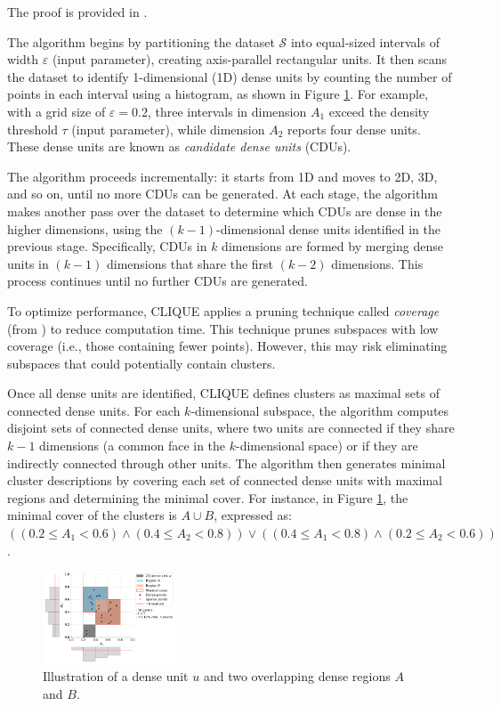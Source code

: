 The proof is provided in \cite{clique}.

The algorithm begins by partitioning the dataset $\mathcal{S}$ into equal-sized intervals of width $\varepsilon$ (input parameter), creating axis-parallel rectangular units. It then scans the dataset to identify 1-dimensional (1D) dense units by counting the number of points in each interval using a histogram, as shown in Figure \ref{fig:dense_cells_and_regions}. For example, with a grid size of $\varepsilon = 0.2$, three intervals in dimension $A_1$ exceed the density threshold $\tau$ (input parameter), while dimension $A_2$ reports four dense units. These dense units are known as \textit{candidate dense units} (CDUs).

The algorithm proceeds incrementally: it starts from 1D and moves to 2D, 3D, and so on, until no more CDUs can be generated. At each stage, the algorithm makes another pass over the dataset to determine which CDUs are dense in the higher dimensions, using the $(k-1)$-dimensional dense units identified in the previous stage. Specifically, CDUs in $k$ dimensions are formed by merging dense units in $(k-1)$ dimensions that share the first $(k-2)$ dimensions. This process continues until no further CDUs are generated.

To optimize performance, CLIQUE applies a pruning technique called \textit{coverage} (from \cite{clique}) to reduce computation time. This technique prunes subspaces with low coverage (i.e., those containing fewer points). However, this may risk eliminating subspaces that could potentially contain clusters.

Once all dense units are identified, CLIQUE defines clusters as maximal sets of connected dense units. For each $k$-dimensional subspace, the algorithm computes disjoint sets of connected dense units, where two units are connected if they share $k-1$ dimensions (a common face in the $k$-dimensional space) or if they are indirectly connected through other units. The algorithm then generates minimal cluster descriptions by covering each set of connected dense units with maximal regions and determining the minimal cover. For instance, in Figure \ref{fig:dense_cells_and_regions}, the minimal cover of the clusters is $A \cup B$, expressed as: $((0.2 \leq A_1 < 0.6) \land (0.4 \leq A_2 < 0.8)) \lor ((0.4 \leq A_1 < 0.8) \land (0.2 \leq A_2 < 0.6))$.
\begin{figure}[H]
    \vspace*{-0.5cm}
    \centering
    \includegraphics[width=0.35\textwidth]{figures/dense_cells_and_regions.png}
    \caption{Illustration of a dense unit $u$ and two overlapping dense regions $A$ and $B$.}
    \label{fig:dense_cells_and_regions}
    \vspace*{-0.5cm}
\end{figure}

